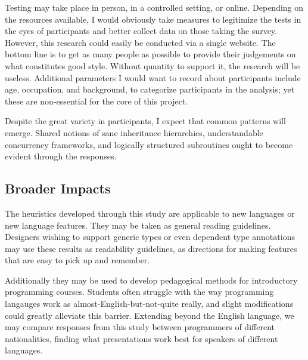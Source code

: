 \documentclass{article}
\begin{document}
Testing may take place in person, in a controlled setting, or online.
Depending on the resources available, I would obviously take measures to legitimize the tests in the eyes of participants and better collect data on those taking the survey.
However, this research could easily be conducted via a single website.
The bottom line is to get as many people as possible to provide their judgements on what constitutes good style.
Without quantity to support it, the research will be useless. 
Additional parameters I would want to record about participants include age, occupation, and background, to categorize participants in the analysis; yet these are non-essential for the core of this project.

Despite the great variety in participants, I expect that common patterns will emerge.
Shared notions of sane inheritance hierarchies, understandable concurrency frameworks, and logically structured subroutines ought to become evident through the responses.


\subsection*{Broader Impacts}
The heuristics developed through this study are applicable to new languages or new language features. 
They may be taken as general reading guidelines. 
Designers wishing to support generic types or even dependent type annotations may use these results as readability guidelines, as directions for making features that are easy to pick up and remember.

Additionally they may be used to develop pedagogical methods for introductory programming courses.
Students often struggle with the way programming langauges work as almost-English-but-not-quite really, and slight modifications could greatly alleviate this barrier.
Extending beyond the English language, we may compare responses from this study between programmers of different nationalities, finding what presentations work best for speakers of different languages.
\end{document}
